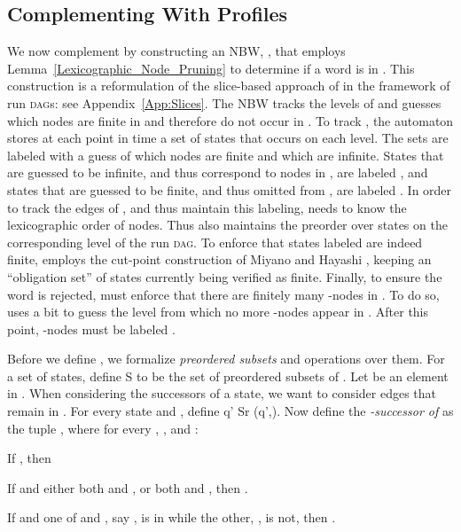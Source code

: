 \documentclass{LMCS}
\newcommand{\forappendix}[2]{#2}
\renewcommand{\forappendix}[2]{#1}
\newcommand{\DAG}{\textsc{dag}\xspace}
\newcommand{\DAGs}{\textsc{dag}s\xspace}
\begin{document}
\subsection{Complementing With Profiles}
We now complement  by constructing an NBW, , that employs
Lemma~\ref{Lexicographic_Node_Pruning} to determine if a word is in . This construction is a
reformulation of the slice-based approach of \cite{KW08} in the framework of run \DAGs\forappendix{:
see Appendix~\ref{App:Slices}}{}.  The NBW  tracks the levels of  and guesses which
nodes are finite in  and therefore do not occur in . To track , the
automaton  stores at each point in time a set  of states that occurs on each level. The
sets  are labeled with a guess of which nodes are finite and which are infinite.  States that are
guessed to be infinite, and thus correspond to nodes in , are labeled , and states
that are guessed to be finite, and thus omitted from , are labeled .  In order to
track the edges of , and thus maintain this labeling,  needs to know the
lexicographic order of nodes.  Thus  also maintains the preorder  over states on
the corresponding level of the run \DAG.  To enforce that states labeled  are indeed finite,
 employs the cut-point construction of Miyano and Hayashi \cite{MH84}, keeping an ``obligation
set'' of states currently being verified as finite.  Finally, to ensure the word is rejected, 
must enforce that there are finitely many -nodes in .  To do so,  uses a bit 
to guess the level from which no more -nodes appear in . After this point, 
-nodes must be labeled .

Before we define , we formalize {\em preordered subsets} and 
operations over them.  For a set  of states, define S to be the set of preordered subsets of .
Let  be an element in .  When considering the successors of
a state, we want to consider edges that remain in .
For every state  and , define q' \in Sr \in \rho(q',\sigma).  
Now define the {\em -successor of } as the tuple
, where for every ,  , and
:
\begin{iteMize}{}
\item If , then 
\item If  and either both  and , or both  and , then .
\item If  and one of  and , say , is in  while the other, , is not, then . 
\end{iteMize}
\end{document}

